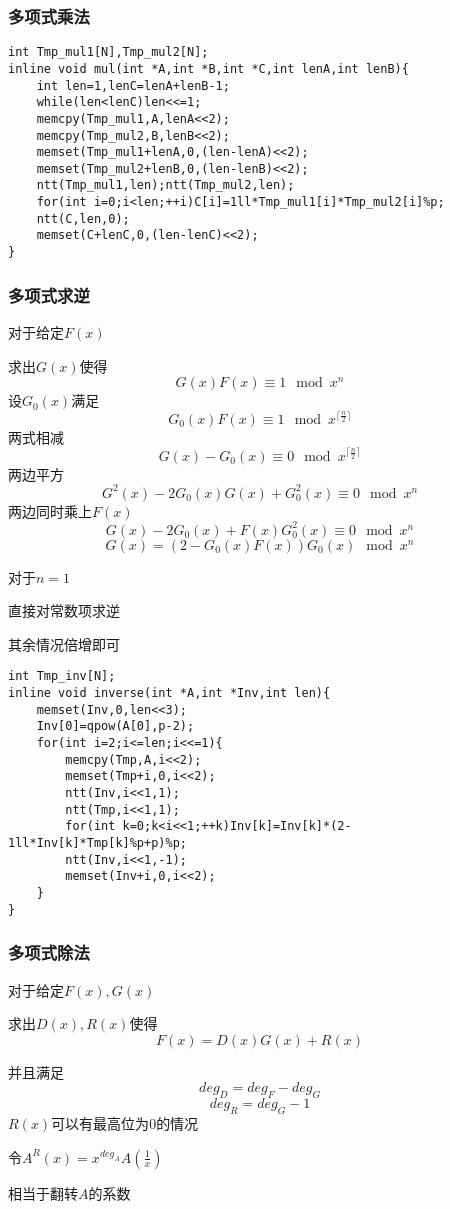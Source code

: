 \documentclass{ctexart}
\begin{document}
\subsubsection{多项式乘法}
\begin{lstlisting}
int Tmp_mul1[N],Tmp_mul2[N];
inline void mul(int *A,int *B,int *C,int lenA,int lenB){
	int len=1,lenC=lenA+lenB-1;
	while(len<lenC)len<<=1;
	memcpy(Tmp_mul1,A,lenA<<2);
	memcpy(Tmp_mul2,B,lenB<<2);
	memset(Tmp_mul1+lenA,0,(len-lenA)<<2);
	memset(Tmp_mul2+lenB,0,(len-lenB)<<2);
	ntt(Tmp_mul1,len);ntt(Tmp_mul2,len);
	for(int i=0;i<len;++i)C[i]=1ll*Tmp_mul1[i]*Tmp_mul2[i]%p;
	ntt(C,len,0);
	memset(C+lenC,0,(len-lenC)<<2);
}
\end{lstlisting}
\subsubsection{多项式求逆}
对于给定$F(x)$

求出$G(x)$使得
$$
G(x)F(x) \equiv 1 \mod x^n
$$
设$G_0(x)$满足
$$
G_0(x)F(x) \equiv 1 \mod x^{\lceil \frac{n}{2}\rceil}
$$
两式相减
$$
G(x)-G_0(x)\equiv 0 \mod x^{\lceil \frac{n}{2}\rceil}
$$
两边平方
$$
G^2(x)-2G_0(x)G(x)+G_0^2(x)\equiv 0 \mod x^n
$$
两边同时乘上$F(x)$
$$
G(x)-2G_0(x)+F(x)G_0^2(x)\equiv 0 \mod x^n
$$
$$
G(x)=(2-G_0(x)F(x))G_0(x) \mod x^n
$$

对于$n=1$

直接对常数项求逆

其余情况倍增即可
\begin{lstlisting}
int Tmp_inv[N];
inline void inverse(int *A,int *Inv,int len){
    memset(Inv,0,len<<3);
    Inv[0]=qpow(A[0],p-2);
    for(int i=2;i<=len;i<<=1){
        memcpy(Tmp,A,i<<2);
        memset(Tmp+i,0,i<<2);
        ntt(Inv,i<<1,1);
        ntt(Tmp,i<<1,1);
        for(int k=0;k<i<<1;++k)Inv[k]=Inv[k]*(2-1ll*Inv[k]*Tmp[k]%p+p)%p;
        ntt(Inv,i<<1,-1);
        memset(Inv+i,0,i<<2);
    }
}
\end{lstlisting}
\subsubsection{多项式除法}
对于给定$F(x),G(x)$

求出$D(x),R(x)$使得
$$
F(x)=D(x)G(x)+R(x)
$$

并且满足
$$
deg_D=deg_F-deg_G
$$
$$
deg_R=deg_G-1
$$
$R(x)$可以有最高位为$0$的情况

令$A^R(x)=x^{deg_A}A(\frac{1}{x})$

相当于翻转$A$的系数
\end{document}
